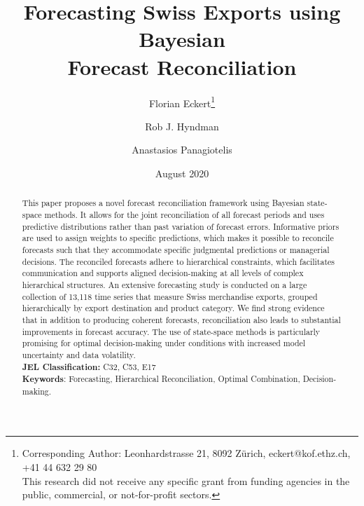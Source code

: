 \documentclass[a4paper,fleqn,11pt]{article}
\begin{document}
\title{\huge Forecasting Swiss Exports using Bayesian \\Forecast Reconciliation}

\author[$\dagger$]{Florian Eckert\thanks{Corresponding Author: Leonhardstrasse 21, 8092 Zürich, eckert@kof.ethz.ch, +41 44 632 29 80\\This research did not receive any specific grant from funding agencies in the public, commercial, or not-for-profit sectors.}}
\author[$\ddagger$]{Rob J. Hyndman}
\author[$\ddagger$]{Anastasios Panagiotelis}
\date{August 2020}

\clearpage\maketitle
\thispagestyle{empty}

\begin{abstract}
	\noindent This paper proposes a novel forecast reconciliation framework using Bayesian state-space methods. It allows for the joint reconciliation of all forecast periods and uses predictive distributions rather than past variation of forecast errors. Informative priors are used to assign weights to specific predictions, which makes it possible to reconcile forecasts such that they accommodate specific judgmental predictions or managerial decisions. The reconciled forecasts adhere to hierarchical constraints, which facilitates communication and supports aligned decision-making at all levels of complex hierarchical structures. An extensive forecasting study is conducted on a large collection of 13,118 time series that measure Swiss merchandise exports, grouped hierarchically by export destination and product category. We find strong evidence that in addition to producing coherent forecasts, reconciliation also leads to substantial improvements in forecast accuracy. The use of state-space methods is particularly promising for optimal decision-making under conditions with increased model uncertainty and data volatility. \\
	
	\noindent \textbf{JEL Classification:} C32, C53, E17\\
	\noindent \textbf{Keywords}: Forecasting, Hierarchical Reconciliation, Optimal Combination, Decision-making.
\end{abstract}
\clearpage
\setcounter{page}{1}
\end{document}
